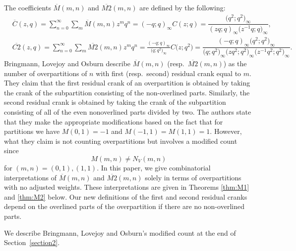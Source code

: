 \documentclass[pdftex]{sigma}
\numberwithin{equation}{section}
\newcommand\thm[1]{\ref{thm:#1}}
\begin{document}
The coefficients $\overline{M}(m,n)$ and $\overline{M2}(m,n)$ are defined by the following:
\begin{align*}
&{}\overline{C}(z,q) = \sum_{n=0}^\infty \sum_m \overline{M}(m,n) z^m q^n=(-q;q)_{\infty}C(z;q)=\dfrac{\bigl(q^2;q^2\bigr)_{\infty}}{(zq;q)_{\infty}\bigl(z^{-1}q;q\bigr)_{\infty}},
\\
&{}\overline{C2}(z,q) = \sum_{n=0}^\infty \sum_m \overline{M2}(m,n) z^m q^n=\frac{(-q;q)_{\infty}}{\bigl(q;q^2\bigr)_{\infty}}C\bigl(z;q^2\bigr)=\dfrac{(-q;q)_{\infty}\bigl(q^2;q^2\bigr)_{\infty}}{\bigl(q;q^2\bigr)_{\infty}\bigl(zq^2;q^2\bigr)_{\infty}\bigl(z^{-1}q^2;q^2\bigr)_{\infty}}.
\end{align*}
Bringmann, Lovejoy and Osburn \cite{Br-Lo-Os} describe $\overline{M}(m,n)$ (resp.\ $\overline{M2}(m,n)$) as the number of overpartitions of $n$ with first (resp.\ second) residual crank equal to $m$. They claim that the first residual crank of an overpartition is obtained by taking the crank of the subpartition consisting of the non-overlined parts. Similarly, the second residual crank is obtained by taking the crank of the subpartition consisting of all of the even nonoverlined parts divided by two. The authors state that they make the appropriate modifications based on the fact that for partitions we have $M(0,1)=-1$ and $M(-1,1)=M(1,1)=1$. However, what they claim is not counting overpartitions but involves a modified count since
\begin{equation*}%
M(m,n)\neq N_V(m,n)
\end{equation*}%
for $(m,n)=(0,1),(1,1)$. In this paper, we give combinatorial interpretations of $\overline{M}(m,n)$ and $\overline{M2}(m,n)$ solely in terms of overpartitions with no adjusted weights. These interpretations are given in Theorems \thm{M1} and \thm{M2} below. Our new definitions of the first and second residual cranks depend on the overlined parts of the overpartition if there are no non-overlined parts.

We describe Bringmann, Lovejoy and Osburn's modified count at the end of Section~\ref{section2}.
\end{document}
